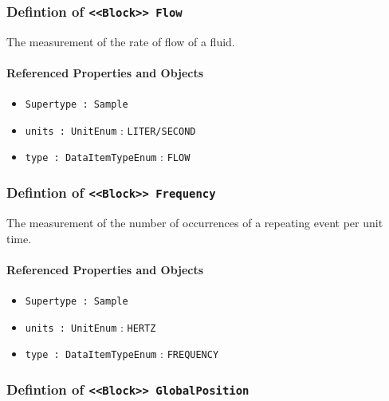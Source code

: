 \subsubsection{Defintion of \texttt{<<Block>> Flow}}
  \label{type:Flow}

\FloatBarrier

The measurement of the rate of flow of a fluid.

\FloatBarrier
\paragraph{Referenced Properties and Objects}

\begin{itemize}
\item \texttt{Supertype : Sample}

\item \texttt{units : UnitEnum} : \texttt{LITER/SECOND}

\item \texttt{type : DataItemTypeEnum} : \texttt{FLOW}

\end{itemize}
\FloatBarrier
\subsubsection{Defintion of \texttt{<<Block>> Frequency}}
  \label{type:Frequency}

\FloatBarrier

The measurement of the number of occurrences of a repeating event per unit time.

\FloatBarrier
\paragraph{Referenced Properties and Objects}

\begin{itemize}
\item \texttt{Supertype : Sample}

\item \texttt{units : UnitEnum} : \texttt{HERTZ}

\item \texttt{type : DataItemTypeEnum} : \texttt{FREQUENCY}

\end{itemize}
\FloatBarrier
\subsubsection{Defintion of \texttt{<<Block>> GlobalPosition}}
  \label{type:GlobalPosition}

